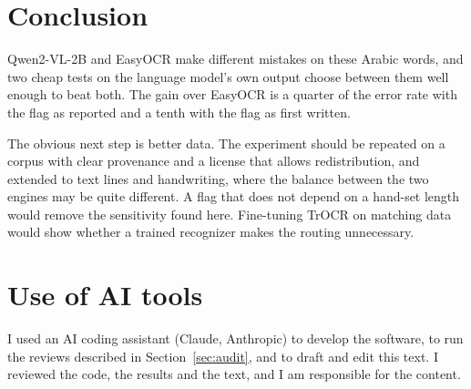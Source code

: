 \documentclass[11pt,a4paper]{article}
\begin{document}
\section{Conclusion}

Qwen2-VL-2B and EasyOCR make different mistakes on these Arabic words, and two
cheap tests on the language model's own output choose between them well
enough to beat both. The gain over EasyOCR is a quarter of the error rate
with the flag as reported and a tenth with the flag as first written.

The obvious next step is better data. The experiment should be repeated on a
corpus with clear provenance and a license that allows redistribution, and
extended to text lines and handwriting, where the balance between the two
engines may be quite different. A flag that does not depend on a hand-set
length would remove the sensitivity found here. Fine-tuning TrOCR on matching
data would show whether a trained recognizer makes the routing unnecessary.

\section*{Use of AI tools}

I used an AI coding assistant (Claude, Anthropic) to develop the software, to
run the reviews described in Section~\ref{sec:audit}, and to draft and edit
this text. I reviewed the code, the results and the text, and I am responsible
for the content.
\end{document}
